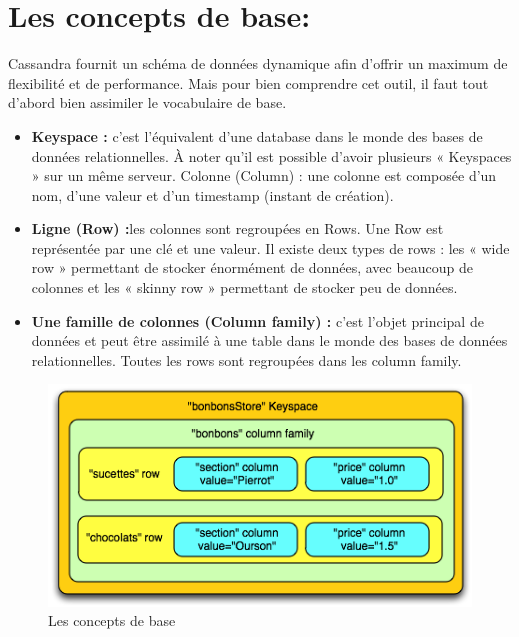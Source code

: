 \section{Les concepts de base:}
Cassandra fournit un schéma de données dynamique afin d'offrir un maximum de flexibilité et de performance. Mais pour bien comprendre cet outil, il faut tout d'abord bien assimiler le vocabulaire de base.

\begin{itemize}[label=\textbullet]
	\item \textbf{Keyspace :} c'est l'équivalent d'une database dans le monde des bases de données relationnelles. À noter qu'il est possible d'avoir plusieurs « Keyspaces » sur un même serveur.
Colonne (Column) : une colonne est composée d'un nom, d'une valeur et d'un timestamp (instant de création).

	\item \textbf{Ligne (Row) :}les colonnes sont regroupées en Rows. Une Row est représentée par une clé et une valeur. Il existe deux types de rows : les « wide row » permettant de stocker énormément de données, avec beaucoup de colonnes et les « skinny row » permettant de stocker peu de données.
	
	\item \textbf{Une famille de colonnes (Column family) :} c'est l'objet principal de données et peut être assimilé à une table dans le monde des bases de données relationnelles. Toutes les rows sont regroupées dans les column family.
\end{itemize}

\begin{figure}[h]
	\centering
    \includegraphics[scale=1]{img/part1/5.1}
    \caption{Les concepts de base}
\end{figure}
